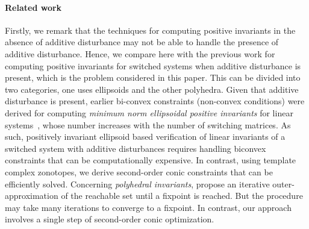 



\paragraph*{Related work}  Firstly, we remark that the techniques for
computing positive invariants in the absence of additive disturbance
may not be able to handle the presence of additive disturbance.
Hence, we compare here with the previous work for computing positive
invariants for switched systems when additive disturbance is present,
which is the problem considered in this paper.  This can be divided
into two categories, one uses ellipsoids and the other
polyhedra. Given that additive disturbance is present, earlier
bi-convex constraints (non-convex conditions) were derived for
computing \emph{minimum norm ellipsoidal positive invariants} for
linear systems~\cite{polyak2006rejection}, whose number increases with
the number of switching matrices.  As such, positively invariant
ellipsoid based verification of linear invariants of a switched system
with additive disturbances requires handling biconvex constraints that
can be computationally expensive.  In contrast, using template complex
zonotopes, we derive second-order conic constraints that can be
efficiently solved.  %
Concerning
\emph{polyhedral invariants}, \cite{kouramas2005minimal,DBLP:conf/aplas/DangG11} propose an
iterative outer-approximation of the reachable set until a fixpoint is
reached. But the procedure may take many iterations to converge to a fixpoint.  In
contrast, our approach involves a single step of second-order conic
optimization.




